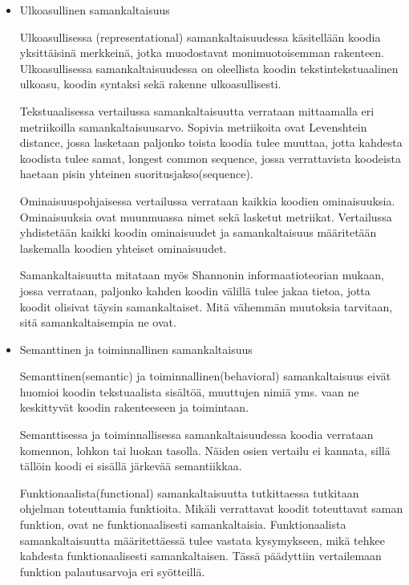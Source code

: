 \documentclass[finnish]{tktltiki2}
\theoremstyle{definition}
\theoremstyle{remark}
\begin{document}
\begin{itemize}
\item{Ulkoasullinen samankaltaisuus}

Ulkoasullisessa (representational) samankaltaisuudessa käsitellään koodia yksittäisinä merkkeinä, jotka muodostavat monimuotoisemman rakenteen. Ulkoasullisessa samankaltaisuudessa on oleellista koodin tekstintekstuaalinen ulkoasu, koodin syntaksi sekä rakenne ulkoasullisesti.

Tekstuaalisessa vertailussa samankaltaisuutta verrataan mittaamalla eri metriikoilla samankaltaisuusarvo. Sopivia metriikoita ovat Levenshtein distance, jossa lasketaan paljonko toista koodia tulee muuttaa, jotta kahdesta koodista tulee samat, longest common sequence, jossa verrattavista koodeista haetaan pisin yhteinen suoritusjakso(sequence).


Ominaisuuspohjaisessa vertailussa verrataan kaikkia koodien ominaisuuksia. Ominaisuuksia ovat muunmuassa nimet sekä lasketut metriikat. Vertailussa yhdistetään kaikki koodin ominaisuudet ja samankaltaisuus määritetään laskemalla koodien yhteiset ominaisuudet.

Samankaltaisuutta mitataan myös Shannonin informaatioteorian mukaan, jossa verrataan, paljonko kahden koodin välillä tulee jakaa tietoa, jotta koodit olisivat täysin samankaltaiset. Mitä vähemmän muutoksia tarvitaan, sitä samankaltaisempia ne ovat.

\item{Semanttinen ja toiminnallinen samankaltaisuus}

Semanttinen(semantic) ja toiminnallinen(behavioral) samankaltaisuus eivät huomioi koodin tekstuaalista sisältöä, muuttujen nimiä yms. vaan ne keskittyvät koodin rakenteeseen ja toimintaan.

Semanttisessa ja toiminnallisessa samankaltaisuudessa koodia verrataan komennon, lohkon tai luokan tasolla. Näiden osien vertailu ei kannata, sillä tällöin koodi ei sisällä järkevää semantiikkaa.

Funktionaalista(functional) samankaltaisuutta tutkittaessa tutkitaan ohjelman toteuttamia funktioita. Mikäli verrattavat koodit toteuttavat saman funktion, ovat ne funktionaalisesti samankaltaisia. Funktionaalista samankaltaisuutta määritettäessä tulee vastata kysymykseen, mikä tehkee kahdesta funktionaalisesti samankaltaisen. Tässä päädyttiin vertailemaan funktion palautusarvoja eri syötteillä.


\end{itemize}
\end{document}
